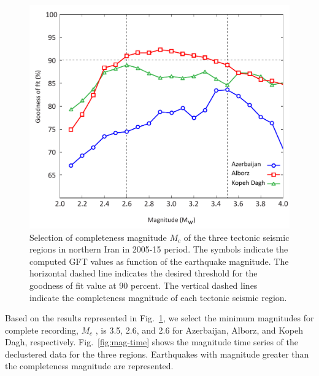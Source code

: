 \begin{figure} [ht]
\centering
\includegraphics[scale=0.4]{figures/pdf/Figure05.pdf} 
\caption{ Selection of completeness magnitude $M_c$ of the three tectonic seismic regions in northern Iran in 2005-15 period. The symbols indicate the computed GFT values as function of the earthquake magnitude. The horizontal dashed line indicates the desired threshold for the goodness of fit value at 90 percent. The vertical dashed lines indicate the completeness magnitude of each tectonic seismic region.}
\label{fig:completeness}
\end{figure} 
\noindent
Based on the results represented in Fig.~\ref{fig:completeness}, we select the minimum magnitudes for complete recording,  $M_c$ , is 3.5, 2.6, and 2.6 for Azerbaijan, Alborz, and Kopeh Dagh, respectively. Fig.~\ref{fig:mag-time}  shows the magnitude time series of the declustered data for the three regions. Earthquakes with magnitude greater than the completeness magnitude are represented. 

